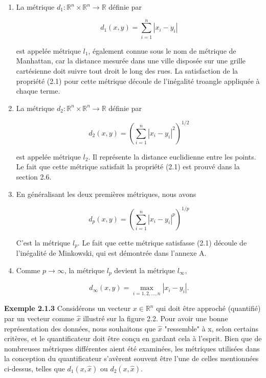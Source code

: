 \documentclass[10pt,twoside,a4paper]{book}
\begin{document}
\begin{enumerate}
  \item La métrique $d_1:\mathbb{R}^n \times \mathbb{R}^n \longrightarrow \mathbb{R}$ définie par
  
  \begin{equation*}
    d_1(x, y) = \sum_{i=1}^{n} |x_i - y_i|
  \end{equation*}
  
  \noindent
  est appelée métrique $l_1$, également connue sous le nom de métrique de Manhattan, car la distance mesurée dans une ville disposée sur une grille 
  cartésienne doit suivre tout droit le long des rues. La satisfaction de la propriété (2.1) pour cette métrique découle de l'inégalité troangle appliquée à chaque terme.
  \item La métrique $d_2:\mathbb{R}^n \times \mathbb{R}^n \longrightarrow \mathbb{R}$ définie par
  
  \begin{equation*}
    d_2(x, y) = \left({\sum_{i=1}^{n} |x_i - y_i|^2}\right)^{1/2}
  \end{equation*}

  \noindent
  est appelée métrique $l_2$. Il représente la distance euclidienne entre les points. Le fait que cette métrique satisfait la propriété (2.1) est prouvé dans la section 2.6.
  \item En généralisant les deux premières métriques, nous avons
  
  \begin{equation*}
    d_p(x, y) = \left({\sum_{i=1}^{n} |x_i - y_i|^p}\right)^{1/p}
  \end{equation*}

  \noindent
  C'est la métrique $l_p$. Le fait que cette métrique satisfasse (2.1) découle de l'inégalité de Minkowski, qui est démontrée dans l'annexe A.
  \item Comme $p \longrightarrow \infty$, la métrique $l_p$ devient la métrique $l_\infty$,
  
  \begin{equation*}
    d_\infty(x, y) = \max\limits_{i=1,2,...,n} |x_i - y_i|.
  \end{equation*}
\end{enumerate}

\vspace{4mm}
\noindent
\textbf{Exemple 2.1.3} Considérons un vecteur $x \in \mathbb{R}^n$ qui doit être approché (quantifié) par un vecteur comme $\hat{x}$ illustré sur la figure 2.2. 
Pour avoir une bonne représentation des données, nous souhaitons que $\hat{x}$ "ressemble" à x, selon certains critères, et le quantificateur doit être conçu en gardant cela à l'esprit. 
Bien que de nombreuses métriques différentes aient été examinées, les métriques utilisées dans la conception du quantificateur s'avèrent souvent être l'une de celles mentionnées 
ci-dessus, telles que $d_1(x, \hat{x})$ ou $d_2(x, \hat{x})$.
\end{document}
